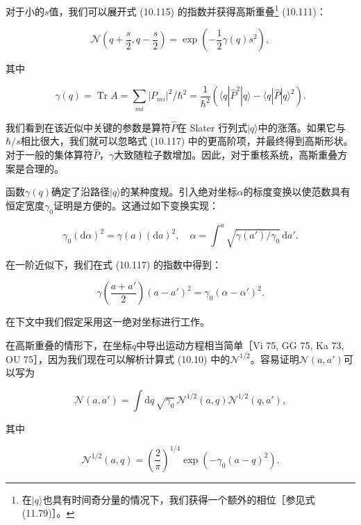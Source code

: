 对于小的$s$值，我们可以展开式 (10.115) 的指数并获得高斯重叠\footnote{在$|q\rangle$也具有时间奇分量的情况下，我们获得一个额外的相位［参见式 (11.79)］。}
(10.111)：

\begin{equation}
\mathscr{N}\left(q+\frac{s}{2},q-\frac{s}{2}\right)=\exp\left(-\frac{1}{2}\gamma(q)s^{2}\right),\label{eq:10.117}
\end{equation}

其中

\begin{equation}
\gamma(q)=\operatorname{Tr}A=\sum_{mi}|P_{mi}|^{2}/\hbar^{2}=\frac{1}{\hbar^{2}}\left(\langle q|\hat{P}^{2}|q\rangle-\langle q|\hat{P}|q\rangle^{2}\right).\label{eq:10.118}
\end{equation}

我们看到在该近似中关键的参数是算符$\hat{P}$在 Slater 行列式$|q\rangle$中的涨落。如果它与$\hbar/s$相比很大，我们就可以忽略式
(10.117) 中的更高阶项，并最终得到高斯形状。对于一般的集体算符$\hat{P}$，$\gamma$大致随粒子数增加。因此，对于重核系统，高斯重叠方案是合理的。

函数$\gamma(q)$确定了沿路径$|q\rangle$的某种度规。引入绝对坐标$\alpha$的标度变换以使范数具有恒定宽度$\gamma_{0}$证明是方便的。这通过如下变换实现：

\begin{equation}
\gamma_{0}(\mathrm{d}\alpha)^{2}=\gamma(a)(\mathrm{d}a)^{2},\quad\alpha=\int^{a}\sqrt{\gamma(a')/\gamma_{0}}\,\mathrm{d}a'.\label{eq:10.119}
\end{equation}

在一阶近似下，我们在式 (10.117) 的指数中得到：

\[
\gamma\left(\frac{a+a'}{2}\right)(a-a')^{2}=\gamma_{0}(\alpha-\alpha')^{2}.
\]

在下文中我们假定采用这一绝对坐标进行工作。

在高斯重叠的情形下，在坐标$q$中导出运动方程相当简单［Vi 75, GG 75, Ka 73, OU 75］，因为我们现在可以解析计算式
(10.10) 中的$\mathscr{N}^{1/2}$。容易证明$\mathscr{N}(a,a')$可以写为

\[
\mathscr{N}(a,a')=\int\mathrm{d}q\,\sqrt{\gamma_{0}}\,\mathscr{N}^{1/2}(a,q)\mathscr{N}^{1/2}(q,a'),
\]

其中

\begin{equation}
\mathscr{N}^{1/2}(a,q)=\left(\frac{2}{\pi}\right)^{1/4}\exp\left(-\gamma_{0}(a-q)^{2}\right).\label{eq:10.120}
\end{equation}

